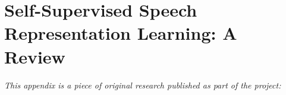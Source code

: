 
\chapter[self"=supervised speech representation learning: a review]{Self-Supervised Speech Representation Learning: A Review}
\label{app:paper-review}

\textit{This appendix is a piece of original research published as part of the project:} \newline
\begin{center}
    \begin{enumerate}[leftmargin=8mm,rightmargin=8mm,topsep=0mm,label={[\Alph*]}]
        \setcounter{enumi}{6}
        \item {} \shared \hspace{0.1em} \parencite{mohamed_selfsupervised_2022}
        \end{enumerate}
\end{center}

